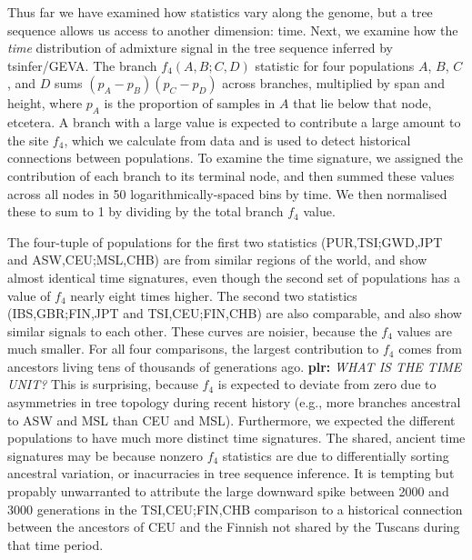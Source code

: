 \documentclass{article}
\newcommand{\plr}[1]{{\color{blue}\textbf{plr:} \it #1}}
\begin{document}
Thus far we have examined how statistics vary along the genome,
but a tree sequence allows us access to another dimension: time.
Next, we examine how the \emph{time} distribution of admixture signal
in the tree sequence inferred by tsinfer/GEVA.
The branch $f_4(A, B; C, D)$ statistic for four populations $A$, $B$, $C$, and $D$
sums $(p_A - p_B)(p_C - p_D)$ across branches, multiplied by span and height,
where $p_A$ is the proportion of samples in $A$ that lie below that node, etcetera.
A branch with a large value is expected to contribute a large amount to the site $f_4$,
which we calculate from data and is used to detect historical connections between populations.
To examine the time signature, we assigned the contribution of each branch
to its terminal node,
and then summed these values across all nodes in 50 logarithmically-spaced bins by time.
We then normalised these to sum to 1 by dividing by the total branch $f_4$ value.

The four-tuple of populations for the first two statistics (PUR,TSI;GWD,JPT and ASW,CEU;MSL,CHB)
are from similar regions of the world,
and show almost identical time signatures,
even though the second set of populations has a value of $f_4$ nearly eight times higher.
The second two statistics (IBS,GBR;FIN,JPT and TSI,CEU;FIN,CHB) are also comparable,
and also show similar signals to each other.
These curves are noisier, because the $f_4$ values are much smaller.
For all four comparisons, the largest contribution to $f_4$ comes from
ancestors living tens of thousands of generations ago.
\plr{WHAT IS THE TIME UNIT?}
This is surprising, because $f_4$ is expected to deviate from zero due to asymmetries in tree topology
during recent history (e.g., more branches ancestral to ASW and MSL than CEU and MSL).
Furthermore, we expected the different populations to have much more distinct time signatures.
The shared, ancient time signatures may be because nonzero $f_4$ statistics
are due to differentially sorting ancestral variation,
or inacurracies in tree sequence inference.
It is tempting but propably unwarranted to attribute the
large downward spike between 2000 and 3000 generations in the TSI,CEU;FIN,CHB comparison
to a historical connection between the ancestors of CEU and the Finnish not shared by the Tuscans
during that time period.
\end{document}
